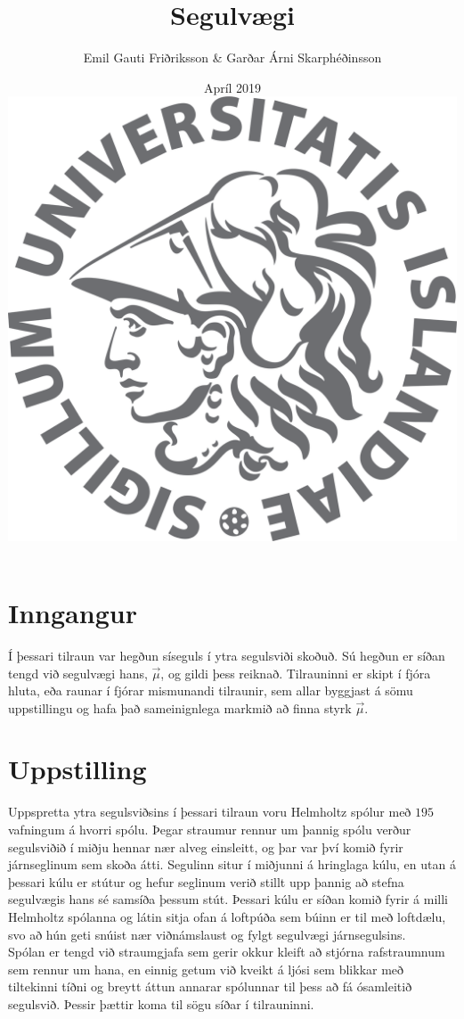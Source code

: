 \documentclass[11pt]{article}
\title{{\Huge Segulvægi}}
\author{Emil Gauti Friðriksson \& Garðar Árni Skarphéðinsson}
\date{Apríl 2019 \\
\vspace{5cm}
\includegraphics[width = .6\textwidth]{HIlogo1.png}}
\begin{document}
\maketitle
\thispagestyle{empty}

\newpage

\section{Inngangur}
Í þessari tilraun var hegðun síseguls í ytra segulsviði skoðuð. Sú hegðun er síðan tengd við segulvægi hans, $\Vec{\mu}$, og gildi þess reiknað. Tilrauninni er skipt í fjóra hluta, eða raunar í fjórar mismunandi tilraunir, sem allar byggjast á sömu uppstillingu og hafa það sameinignlega markmið að finna styrk $\Vec{\mu}$.
\section{Uppstilling}
Uppspretta ytra segulsviðsins í þessari tilraun voru Helmholtz spólur með $195$ vafningum á hvorri spólu. Þegar straumur rennur um þannig spólu verður segulsviðið í miðju hennar nær alveg einsleitt, og þar var því komið fyrir járnseglinum sem skoða átti. Segulinn situr í miðjunni á hringlaga kúlu, en utan á þessari kúlu er stútur og hefur seglinum verið stillt upp þannig að stefna segulvægis hans sé samsíða þessum stút. Þessari kúlu er síðan komið fyrir á milli Helmholtz spólanna og látin sitja ofan á loftpúða sem búinn er til með loftdælu, svo að hún geti snúist nær viðnámslaust og fylgt segulvægi járnsegulsins. \\
Spólan er tengd við straumgjafa sem gerir okkur kleift að stjórna rafstraumnum sem rennur um hana, en einnig getum við kveikt á ljósi sem blikkar með tiltekinni tíðni og breytt áttun annarar spólunnar til þess að fá ósamleitið segulsvið. Þessir þættir koma til sögu síðar í tilrauninni. 
\end{document}
